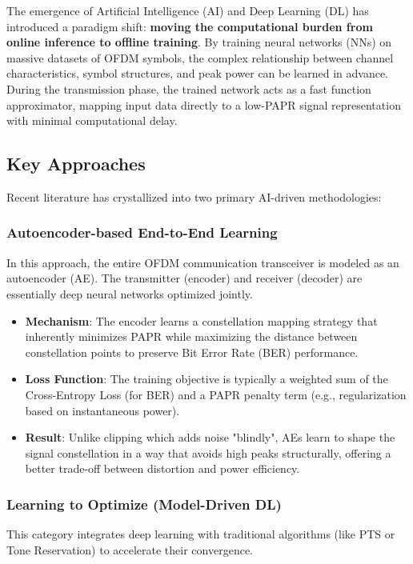 \documentclass[12pt, a4paper, onecolumn]{article}
\begin{document}
The emergence of Artificial Intelligence (AI) and Deep Learning (DL) has introduced a paradigm shift: \textbf{moving the computational burden from online inference to offline training}. By training neural networks (NNs) on massive datasets of OFDM symbols, the complex relationship between channel characteristics, symbol structures, and peak power can be learned in advance. During the transmission phase, the trained network acts as a fast function approximator, mapping input data directly to a low-PAPR signal representation with minimal computational delay.

\subsection{Key Approaches}
Recent literature has crystallized into two primary AI-driven methodologies:

\subsubsection{Autoencoder-based End-to-End Learning}
In this approach, the entire OFDM communication transceiver is modeled as an autoencoder (AE). The transmitter (encoder) and receiver (decoder) are essentially deep neural networks optimized jointly.

\begin{itemize}
    \item \textbf{Mechanism}: The encoder learns a constellation mapping strategy that inherently minimizes PAPR while maximizing the distance between constellation points to preserve Bit Error Rate (BER) performance.
    \item \textbf{Loss Function}: The training objective is typically a weighted sum of the Cross-Entropy Loss (for BER) and a PAPR penalty term (e.g., regularization based on instantaneous power).
    \item \textbf{Result}: Unlike clipping which adds noise "blindly", AEs learn to shape the signal constellation in a way that avoids high peaks structurally, offering a better trade-off between distortion and power efficiency.
\end{itemize}

\subsubsection{Learning to Optimize (Model-Driven DL)}
This category integrates deep learning with traditional algorithms (like PTS or Tone Reservation) to accelerate their convergence.
\end{document}

